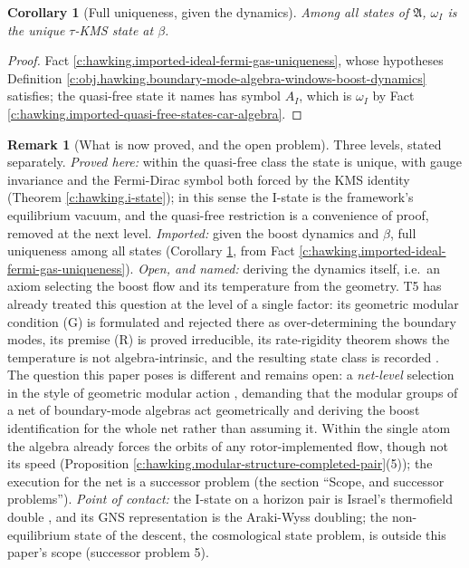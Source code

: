 \documentclass[11pt]{article}
\newtheorem{corollary}[theorem]{Corollary}
\theoremstyle{definition}
\newtheorem{remark}[theorem]{Remark}
\theoremstyle{plain}
\begin{document}
\begin{corollary}[Full uniqueness, given the dynamics]\label{c:hawking.full-uniqueness-given-dynamics}
Among all states of $\mathfrak{A}$, $\omega_I$ is the unique $\tau$-KMS state at $\beta$.
\end{corollary}
\begin{proof}
Fact \ref{c:hawking.imported-ideal-fermi-gas-uniqueness}, whose hypotheses Definition \ref{c:obj.hawking.boundary-mode-algebra-windows-boost-dynamics} satisfies; the quasi-free state it names has symbol $A_I$, which is $\omega_I$ by Fact \ref{c:hawking.imported-quasi-free-states-car-algebra}.

\end{proof}

\begin{remark}[What is now proved, and the open problem]\label{c:note.hawking.what-now-proved-open-problem}
Three levels, stated separately. \emph{Proved here:} within the quasi-free class the state is unique, with gauge invariance and the Fermi-Dirac symbol both forced by the KMS identity (Theorem \ref{c:hawking.i-state}); in this sense the I-state is the framework's equilibrium vacuum, and the quasi-free restriction is a convenience of proof, removed at the next level. \emph{Imported:} given the boost dynamics and $\beta$, full uniqueness among all states (Corollary \ref{c:hawking.full-uniqueness-given-dynamics}, from Fact \ref{c:hawking.imported-ideal-fermi-gas-uniqueness}). \emph{Open, and named:} deriving the dynamics itself, i.e.\ an axiom selecting the boost flow and its temperature from the geometry. T5 has already treated this question at the level of a single factor: its geometric modular condition (G) is formulated and rejected there as over-determining the boundary modes, its premise (R) is proved irreducible, its rate-rigidity theorem shows the temperature is not algebra-intrinsic, and the resulting state class is recorded \cite[Def.~7.12, Thms.~7.16 and 7.28, Cor.~7.32]{ButlerT5}. The question this paper poses is different and remains open: a \emph{net-level} selection in the style of geometric modular action \cite{BDFS2000}, demanding that the modular groups of a net of boundary-mode algebras act geometrically and deriving the boost identification for the whole net rather than assuming it. Within the single atom the algebra already forces the orbits of any rotor-implemented flow, though not its speed (Proposition \ref{c:hawking.modular-structure-completed-pair}(5)); the execution for the net is a successor problem (the section ``Scope, and successor problems''). \emph{Point of contact:} the I-state on a horizon pair is Israel's thermofield double \cite{Israel1976}, and its GNS representation is the Araki-Wyss doubling; the non-equilibrium state of the descent, the cosmological state problem, is outside this paper's scope (successor problem 5).
\end{remark}
\end{document}
